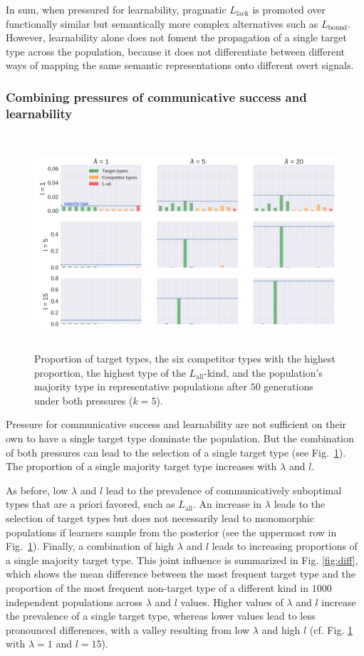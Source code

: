 \documentclass[a4paper, 11pt]{article}
\theoremstyle{Satz}
\newcommand{\mylang}[1]{\ensuremath{L_{\text{#1}}}\xspace} %
\newcommand{\Lall}{\mylang{all}}
\newcommand{\Lbound}{\mylang{bound}}
\newcommand{\Llack}{\mylang{lack}}
\begin{document}
In sum, when pressured for learnability, pragmatic $\Llack$ is promoted over functionally
similar but semantically more complex alternatives such as $\Lbound$. However, learnability
alone does not foment the propagation of a single target type across the population, because it
does not differentiate between different ways of mapping the same semantic representations onto
different overt signals.


\subsubsection{Combining pressures of communicative success and learnability}


\begin{figure}[t]
\centering
\includegraphics[width=1\textwidth,height=8cm,keepaspectratio]{./plots/alt-fig3-r+m}
\caption{Proportion of target types, the six competitor types with the highest proportion, the highest type of the $\Lall$-kind, and the population's majority type in representative populations after $50$ generations under both pressures ($k = 5$).}
\label{fig:rmd}
\end{figure}

Pressure for communicative success and learnability are not sufficient on their own to have a
single target type dominate the population. But the combination of both pressures can lead to
the selection of a single target type (see Fig.~\ref{fig:rmd}). The proportion of a single
majority target type increases with $\lambda$ and $l$.

As before, low $\lambda$ and $l$ lead to the prevalence of communicatively suboptimal types
that are a priori favored, such as $\Lall$. An increase in $\lambda$ leads to the selection of
target types but does not necessarily lead to monomorphic populations if learners sample from
the posterior (see the uppermost row in Fig.~\ref{fig:rmd}). Finally, a combination of high
$\lambda$ and $l$ leads to increasing proportions of a single majority target type. This joint
influence is summarized in Fig. \ref{fig:diff}, which shows the mean difference between the
most frequent target type and the proportion of the most frequent non-target type of a
different kind in $1000$ independent populations across $\lambda$ and $l$ values. Higher values
of $\lambda$ and $l$ increase the prevalence of a single target type, whereas lower values lead
to less pronounced differences, with a valley resulting from low $\lambda$ and high $l$
(cf. Fig. \ref{fig:rmd} with $\lambda = 1$ and $l=15$).
\end{document}
